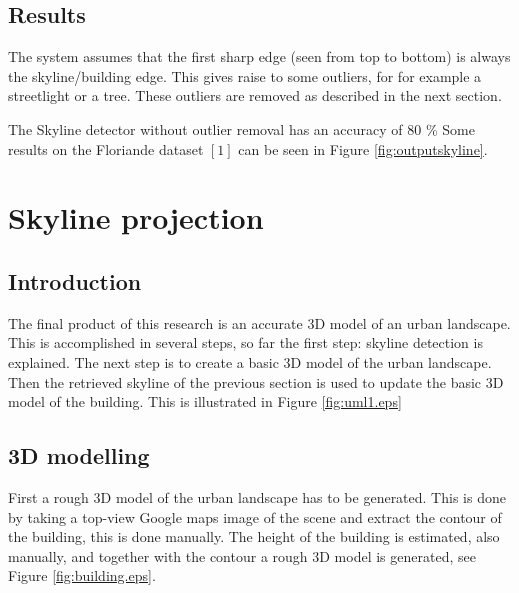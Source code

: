 \documentclass[10pt]{article}
\begin{document}
 \subsection{Results}%
The system assumes that the first sharp edge (seen from top to bottom) is
always the skyline/building edge. This gives raise to some outliers, for 
for example a streetlight or a tree. These outliers are removed as described in
the next section.  

The Skyline detector without outlier removal has an accuracy of 80 \% 
Some results on the Floriande dataset $[1]$ can be seen in Figure \ref{fig:outputskyline}.



\section{Skyline projection}
 \subsection{Introduction}
The final product of this research is an accurate 3D model of an urban
landscape. This is accomplished in several steps, so far the first step: skyline detection is
explained. The next step is to create a basic 3D model of the urban landscape.
Then the retrieved skyline of the previous section is used to update the basic
3D model of the building. This is illustrated in Figure \ref{fig:uml1.eps}




   \subsection{3D modelling}
First a rough 3D model of the urban landscape has to be generated. This is done
by taking a top-view Google maps image of the scene and extract the contour of
the building, this is done manually. 
The height of the building is estimated, also manually, and together with the
contour a rough 3D model is generated, see Figure \ref{fig:building.eps}. 


\end{document}
